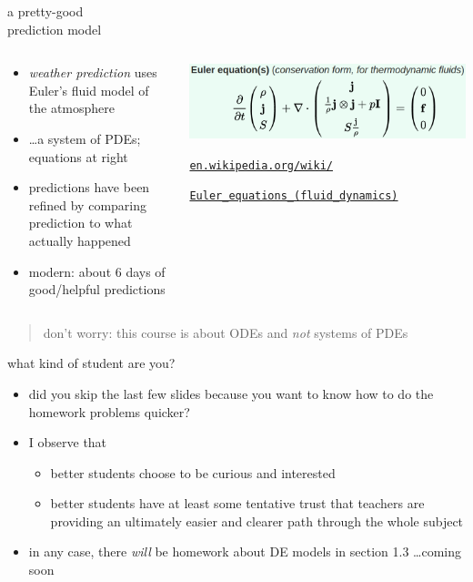\documentclass{beamer}
\begin{document}
\begin{frame}{a pretty-good \\ prediction model}

\begin{columns}
\begin{column}{0.5\textwidth}
\begin{itemize}
\item \emph{weather prediction} uses Euler's fluid model of the atmosphere
\item \dots a system of PDEs; equations at right
\item predictions have been refined by comparing prediction to what actually happened
\item modern: about 6 days of good/helpful predictions
\end{itemize}
\end{column}
\begin{column}{0.5\textwidth}
\includegraphics[width=\textwidth]{figs/euler-equations}

\medskip

\quad \tiny \href{https://en.wikipedia.org/wiki/Euler_equations_(fluid_dynamics)}{\texttt{en.wikipedia.org/wiki/}}

\qquad \href{https://en.wikipedia.org/wiki/Euler_equations_(fluid_dynamics)}{\texttt{Euler\_equations\_(fluid\_dynamics)}}
\end{column}
\end{columns}

\bigskip
\begin{quote}
\alert{don't worry}: this course is about ODEs and \emph{not} systems of PDEs
\end{quote}
\end{frame}


\begin{frame}{what kind of student are you?}

\begin{itemize}
\item did you skip the last few slides because you want to know how to do the homework problems quicker?
\item I observe that
    \begin{itemize}
    \item better students choose to be curious and interested
    \item better students have at least some tentative trust that teachers are providing an ultimately easier and clearer path through the whole subject
    \end{itemize}

\bigskip
\item in any case, there \emph{will} be homework about DE models in section 1.3 \dots coming soon
\end{itemize}
\end{frame}
\end{document}

